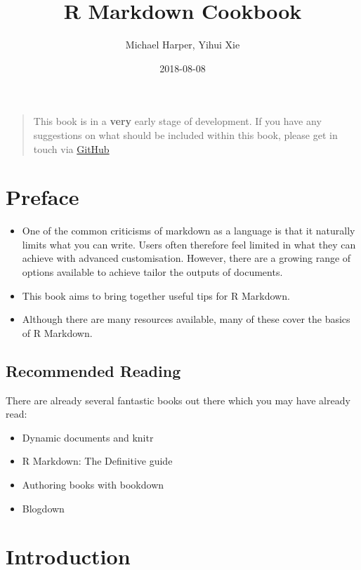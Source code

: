 \documentclass[]{book}
\title{R Markdown Cookbook}
\author{Michael Harper, Yihui Xie}
\date{2018-08-08}
\providecommand{\tightlist}{%
  \setlength{\itemsep}{0pt}\setlength{\parskip}{0pt}}
\begin{document}
\maketitle

{
\setcounter{tocdepth}{1}
\tableofcontents
}
\begin{quote}
This book is in a \textbf{very} early stage of development. If you have
any suggestions on what should be included within this book, please get
in touch via
\href{https://github.com/mikey-harper/rmarkdown-cookbook}{GitHub}
\end{quote}

\chapter*{Preface}\label{preface}

\begin{itemize}
\tightlist
\item
  One of the common criticisms of markdown as a language is that it
  naturally limits what you can write. Users often therefore feel
  limited in what they can achieve with advanced customisation. However,
  there are a growing range of options available to achieve tailor the
  outputs of documents.
\item
  This book aims to bring together useful tips for R Markdown.
\item
  Although there are many resources available, many of these cover the
  basics of R Markdown.
\end{itemize}

\section*{Recommended Reading}\label{recommended-reading}

There are already several fantastic books out there which you may have
already read:

\begin{itemize}
\tightlist
\item
  Dynamic documents and knitr
\item
  R Markdown: The Definitive guide
\item
  Authoring books with bookdown
\item
  Blogdown
\end{itemize}

\chapter{Introduction}\label{intro}
\end{document}
